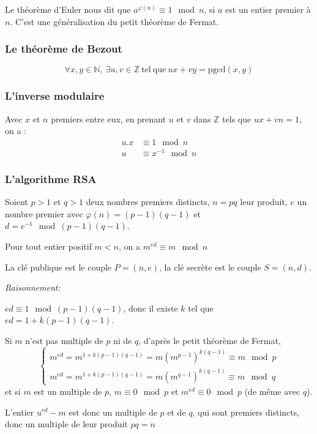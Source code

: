 \documentclass[11pt]{book}
\begin{document}
Le théorème d'Euler nous dit que $ a^{\varphi (n)} \equiv 1 \mod n $, si $a$ est un entier premier à $n$.
C'est une généralisation du petit théorème de Fermat.

\subsubsection{Le théorème de Bezout}
$$ \forall x,y \in \mathbb{N},\ \exists u , v \in \mathbb{Z}\ \mathrm{tel\ que}\ ux+vy=\mathrm{pgcd}(x,y) $$

\subsubsection{L'inverse modulaire}
Avec $x$ et $n$ premiers entre eux, en prenant $u$ et $v$ dans $\mathbb{Z}$ tels que
$ux+vn=1$, on a : 
\begin{align*} 
  u.x &\equiv 1  \mod n  \\
  u &\equiv x^{-1} \mod n 
\end{align*}

\subsubsection{L'algorithme RSA}

Soient $p>1$ et $q>1$ deux nombres premiers distincts, $n=pq$ leur produit,
 $e$ un nombre premier avec 
$\varphi(n) = (p−1)(q−1)$ et $d = e^{−1} \mod{(p−1)(q−1)}$.

Pour tout entier positif $m<n$, on a $m^{ed} ≡ m \mod n$

La clé publique  est le couple $P=(n,e)$,
la clé secrète est le couple $S=(n,d)$.

\textit{Raisonnement:}

$ed≡1 \mod (p−1)(q−1)$, donc il existe $k$ tel que $ed=1+k(p−1)(q−1)$.

Si $m$ n’est pas multiple de $p$ ni de $q$, 
d’après le petit théorème de Fermat,
$$
\begin{cases}
  m^{ed}= m^{1+k(p−1)(q−1)} = m (m^{p-1})^{k(q-1)} \equiv m \mod p \\ 
 
  m^{ed}= m^{1+k(p−1)(q−1)} = m (m^{q-1})^{k(q-1)} \equiv m \mod q
\end{cases}
$$
et si $m$ est un multiple de $p$, $m≡0 \mod p$ et $m^{ed}≡0 \mod p$ (de même avec $q$).

 L’entier $u^{ed}−m$ est donc un multiple de $p$ et de $q$, qui sont premiers distincts, 
 donc un multiple de leur produit $pq=n$
\end{document}
